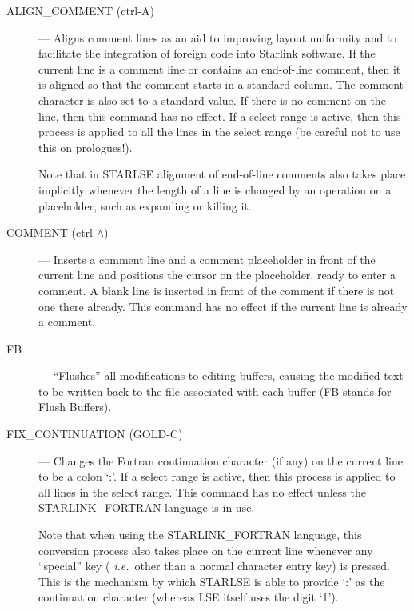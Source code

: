 \begin{description}

\item[ALIGN\_COMMENT (ctrl-A)] --- Aligns comment lines as an aid to improving
layout uniformity and to facilitate the integration of foreign code into
Starlink software. 
If the current line is a comment line or contains an end-of-line comment,
then it is aligned so that the comment starts in a standard column.
The comment character is also set to a standard value.
If there is no comment on the line, then this command has no effect. 
If a select range is active, then this process is applied to all the
lines in the select range (be careful not to use this on prologues!).

Note that in \mbox{STARLSE} alignment of end-of-line comments also takes
place implicitly whenever the length of a line is changed by an operation on
a placeholder, such as expanding or killing it. 

\item[COMMENT (ctrl-$\wedge$)\footnotemark] --- Inserts a comment
line and a comment placeholder in front of the current line and positions
the cursor on the placeholder, ready to enter a comment. 
A blank line is inserted in front of the comment if there is not one
there already. 
This command has no effect if the current line is already a comment. 

\item[FB] --- ``Flushes'' all modifications to editing buffers, causing the
modified text to be written back to the file associated with each buffer (FB
stands for Flush Buffers).

\item[FIX\_CONTINUATION (GOLD-C)] --- Changes the Fortran continuation
character (if any) on the current line to be a colon `:'.
If a select range is active, then this process is applied to all lines in 
the select range.
This command has no effect unless the \mbox{STARLINK\_FORTRAN} language is in 
use.

Note that when using the \mbox{STARLINK\_FORTRAN} language, this conversion 
process also takes place on the current line whenever any ``special'' key ({\em
i.e.}\ other than a normal character entry key) is pressed.
This is the mechanism by which \mbox{STARLSE} is able to provide `:' as the
continuation character (whereas \mbox{LSE} itself uses the digit `1'). 


\end{description}
